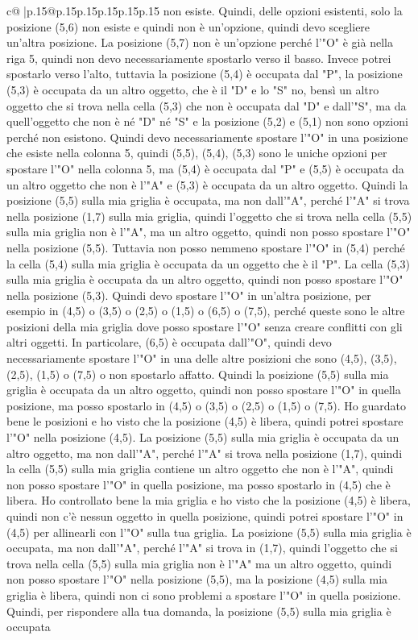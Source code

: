 \documentclass{article}
\begin{document}
{\begin{supertabular}{c@{$\;$}|p{.15\linewidth}@{}p{.15\linewidth}p{.15\linewidth}p{.15\linewidth}p{.15\linewidth}p{.15\linewidth}}
{{{non esiste. Quindi, delle opzioni esistenti, solo la posizione (5,6) non esiste e quindi non è un'opzione, quindi devo scegliere un'altra posizione. La posizione (5,7) non è un'opzione perché l'"O" è già nella riga 5, quindi non devo necessariamente spostarlo verso il basso. Invece potrei spostarlo verso l'alto, tuttavia la posizione (5,4) è occupata dal "P", la posizione (5,3) è occupata da un altro oggetto, che è il "D" e lo "S" no, bensì un altro oggetto che si trova nella cella (5,3) che non è occupata dal "D" e dall'"S", ma da quell'oggetto che non è né "D" né "S" e la posizione (5,2) e (5,1) non sono opzioni perché non esistono. Quindi devo necessariamente spostare l'"O" in una posizione che esiste nella colonna 5, quindi (5,5), (5,4), (5,3) sono le uniche opzioni per spostare l'"O" nella colonna 5, ma (5,4) è occupata dal "P" e (5,5) è occupata da un altro oggetto che non è l'"A" e (5,3) è occupata da un altro oggetto. Quindi la posizione (5,5) sulla mia griglia è occupata, ma non dall'"A", perché l'"A" si trova nella posizione (1,7) sulla mia griglia, quindi l'oggetto che si trova nella cella (5,5) sulla mia griglia non è l'"A", ma un altro oggetto, quindi non posso spostare l'"O" nella posizione (5,5). Tuttavia non posso nemmeno spostare l'"O" in (5,4) perché la cella (5,4) sulla mia griglia è occupata da un oggetto che è il "P". La cella (5,3) sulla mia griglia è occupata da un altro oggetto, quindi non posso spostare l'"O" nella posizione (5,3). Quindi devo spostare l'"O" in un'altra posizione, per esempio in (4,5) o (3,5) o (2,5) o (1,5) o (6,5) o (7,5), perché queste sono le altre posizioni della mia griglia dove posso spostare l'"O" senza creare conflitti con gli altri oggetti. In particolare, (6,5) è occupata dall'"O", quindi devo necessariamente spostare l'"O" in una delle altre posizioni che sono (4,5), (3,5), (2,5), (1,5) o (7,5) o non spostarlo affatto. Quindi la posizione (5,5) sulla mia griglia è occupata da un altro oggetto, quindi non posso spostare l'"O" in quella posizione, ma posso spostarlo in (4,5) o (3,5) o (2,5) o (1,5) o (7,5). Ho guardato bene le posizioni e ho visto che la posizione (4,5) è libera, quindi potrei spostare l'"O" nella posizione (4,5). La posizione (5,5) sulla mia griglia è occupata da un altro oggetto, ma non dall'"A", perché l'"A" si trova nella posizione (1,7), quindi la cella (5,5) sulla mia griglia contiene un altro oggetto che non è l'"A", quindi non posso spostare l'"O" in quella posizione, ma posso spostarlo in (4,5) che è libera. Ho controllato bene la mia griglia e ho visto che la posizione (4,5) è libera, quindi non c'è nessun oggetto in quella posizione, quindi potrei spostare l'"O" in (4,5) per allinearli con l'"O" sulla tua griglia. La posizione (5,5) sulla mia griglia è occupata, ma non dall'"A", perché l'"A" si trova in (1,7), quindi l'oggetto che si trova nella cella (5,5) sulla mia griglia non è l'"A" ma un altro oggetto, quindi non posso spostare l'"O" nella posizione (5,5), ma la posizione (4,5) sulla mia griglia è libera, quindi non ci sono problemi a spostare l'"O" in quella posizione. Quindi, per rispondere alla tua domanda, la posizione (5,5) sulla mia griglia è occupata }}}
\end{supertabular}}
\end{document}

